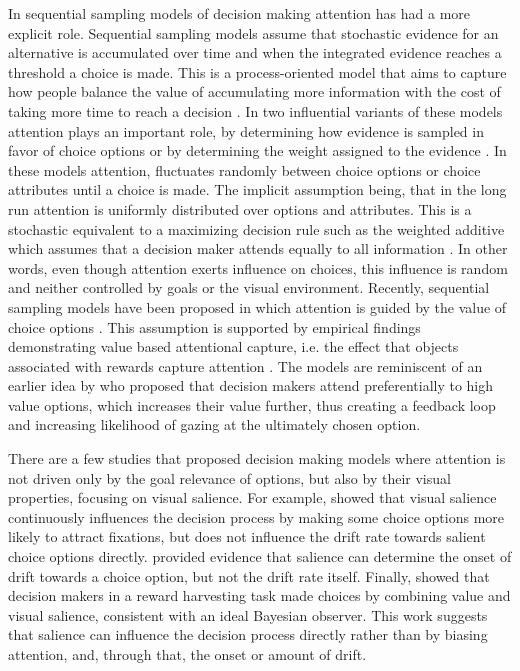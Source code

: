 \documentclass{article}
\begin{document}
In sequential sampling models of decision making attention has had a more explicit role. Sequential sampling models assume that stochastic evidence for an alternative is accumulated over time and when the integrated evidence reaches a threshold a choice is made. This is a process-oriented model that aims to capture how people balance the value of accumulating more information with the cost of taking more time to reach a decision \citep{forstmann2016}. In two influential variants of these models attention plays an important role, by determining how evidence is sampled in favor of choice options \citep{busemeyer1992} or by determining the weight assigned to the evidence \citep{krajbich2010a}. In these models attention, fluctuates randomly between choice options or choice attributes until a choice is made. The implicit assumption being, that in the long run attention is uniformly distributed over options and attributes. This is a stochastic equivalent to a maximizing decision rule such as the weighted additive which assumes that a decision maker attends equally to all information \cite{gloeckner2011a, payne1988}. In other words, even though attention exerts influence on choices, this influence is random and neither controlled by goals or the visual environment. Recently, sequential sampling models have been proposed in which attention is guided by the value of choice options \citep{callaway2019a, gluth2018, gluth2020, krajbich2010a}. This assumption is supported by empirical findings demonstrating value based attentional capture, i.e. the effect that objects associated with rewards capture attention \citep{lepelley2015}. The models are reminiscent of an earlier idea by \cite{shimojo2003a} who proposed that decision makers attend preferentially to high value options, which increases their value further, thus creating a feedback loop and increasing likelihood of gazing at the ultimately chosen option. 

There are a few studies that proposed decision making models where attention is not driven only by the goal relevance of options, but also by their visual properties, focusing on visual salience. For example, \cite{towal2013a} showed that visual salience continuously influences the decision process by making some choice options more likely to attract fixations, but does not influence the drift rate towards salient choice options directly. \cite{chen2013} provided evidence that salience can determine the onset of drift towards a choice option, but not the drift rate itself. Finally, \cite{navalpakkam2010} showed that decision makers in a reward harvesting task made choices by combining value and visual salience, consistent with an ideal Bayesian observer. This work suggests that salience can influence the decision process directly rather than by biasing attention, and, through that, the onset or amount of drift. 
\end{document}
